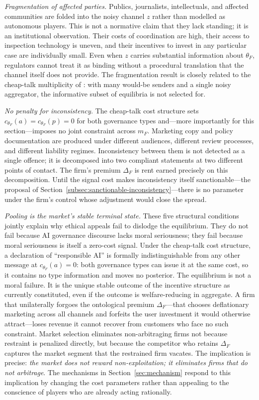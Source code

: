 \emph{Fragmentation of affected parties.} Publics, journalists, intellectuals, and affected communities are folded into the noisy channel $z$ rather than modelled as autonomous players. This is not a normative claim that they lack standing; it is an institutional observation. Their costs of coordination are high, their access to inspection technology is uneven, and their incentives to invest in any particular case are individually small. Even when $z$ carries substantial information about $\theta_F$, regulators cannot treat it as binding without a procedural translation that the channel itself does not provide. The fragmentation result is closely related to the cheap-talk multiplicity of \citet{crawford_sobel1982}: with many would-be senders and a single noisy aggregator, the informative subset of equilibria is not selected for.

\emph{No penalty for inconsistency.} The cheap-talk cost structure sets $c_{\theta_F}(a)=c_{\theta_F}(p)=0$ for both governance types and---more importantly for this section---imposes no joint constraint across $m_F$. Marketing copy and policy documentation are produced under different audiences, different review processes, and different liability regimes. Inconsistency between them is not detected as a single offence; it is decomposed into two compliant statements at two different points of contact. The firm's premium $\Delta_F$ is rent earned precisely on this decomposition. Until the signal cost makes inconsistency itself sanctionable---the proposal of Section~\ref{subsec:sanctionable-inconsistency}---there is no parameter under the firm's control whose adjustment would close the spread.

\emph{Pooling is the market's stable terminal state.} These five structural conditions jointly explain why ethical appeals fail to dislodge the equilibrium. They do not fail because AI governance discourse lacks moral seriousness; they fail because moral seriousness is itself a zero-cost signal. Under the cheap-talk cost structure, a declaration of ``responsible AI'' is formally indistinguishable from any other message at $c_{\theta_F}(a)=0$: both governance types can issue it at the same cost, so it contains no type information and moves no posterior. The equilibrium is not a moral failure. It is the unique stable outcome of the incentive structure as currently constituted, even if the outcome is welfare-reducing in aggregate. A firm that unilaterally forgoes the ontological premium $\Delta_F$---that chooses deflationary marketing across all channels and forfeits the user investment it would otherwise attract---loses revenue it cannot recover from customers who face no such constraint. Market selection eliminates non-arbitraging firms not because restraint is penalized directly, but because the competitor who retains $\Delta_F$ captures the market segment that the restrained firm vacates. The implication is precise: \emph{the market does not reward non-exploitation; it eliminates firms that do not arbitrage}. The mechanisms in Section~\ref{sec:mechanism} respond to this implication by changing the cost parameters rather than appealing to the conscience of players who are already acting rationally.

